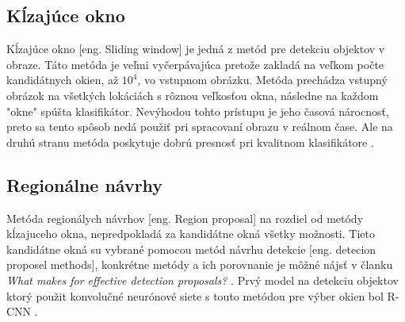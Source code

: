 \begin{comment}
    \subsubsection{Vyhľadávač na základe vizuálnej podobnosti obrázkov}
    Jednu z možných aplikácií detekcie objektou v obraze využíva Pinterest\footnote{\url{https://medium.com/@Pinterest_Engineering/introducing-automatic-object-detection-to-visual-search-e57c29191c30}}.
    Používaju detekciu objektou pre indexovanie rôznych častí obrázka.
    Týmto spôsobom si môže užívateľ pri hľadaní npr. špecifickej kabelky alebo topánok nájsť aj jej podobné.
    \begin{figure}[H]
        \centering
        \texttt{[image: purse]}
        \caption{Prototyp automatického označovania a vyhľadávania objektov\cite{odkaz:ObjectDetectionOverview}}
        \label{pic:kNN}
    \end{figure}    
\end{comment}

\subsection{Kĺzajúce okno}
Kĺzajúce okno [eng. Sliding window] je jedná z metód pre detekciu objektov v obraze.
Táto metóda je veľmi vyčerpávajúca pretože zakladá na veľkom počte kandidátnych okien, až $10^4$, vo vstupnom obrázku.
Metóda prechádza vstupný obrázok na všetkých lokáciách s rôznou veľkosťou okna, následne na každom "okne" spúšta klasifikátor.
Nevýhodou tohto prístupu je jeho časová nárocnosť, preto sa tento spôsob nedá použiť pri spracovaní obrazu v reálnom čase.
Ale na druhú stranu metóda poskytuje dobrú presnosť pri kvalitnom klasifikátore \cite{prop:AutomaticHandgunDetection}.

\subsection{Regionálne návrhy}
Metóda regionálych návrhov [eng. Region proposal] na rozdiel od metódy kĺzajuceho okna, nepredpokladá za kandidátne okná všetky možnosti.
Tieto kandidátne okná su vybrané pomocou metód návrhu detekcie [eng. detecion proposel methods], konkrétne metódy
    a ich porovnanie je môžné nájsť v članku \textit{What makes for effective detection proposals?} \cite{prop:ProposalMethods}.
Prvý model na detekciu objektov ktorý použit konvolučné neurónové siete s touto metódou pre výber okien bol R-CNN \cite{prop:AutomaticHandgunDetection}.
